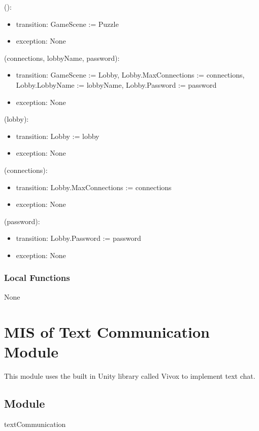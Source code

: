 \documentclass[12pt, titlepage]{article}
\begin{document}
():
\begin{itemize}
\item transition: GameScene := Puzzle
\item exception: None
\end{itemize}

(connections, lobbyName, password):
\begin{itemize}
\item transition: GameScene := Lobby, Lobby.MaxConnections := connections, Lobby.LobbyName := lobbyName, Lobby.Password := password
\item exception: None
\end{itemize}

(lobby):
\begin{itemize}
\item transition: Lobby := lobby
\item exception: None
\end{itemize}

(connections):
\begin{itemize}
\item transition: Lobby.MaxConnections := connections
\item exception: None
\end{itemize}

(password):
\begin{itemize}
\item transition: Lobby.Password := password
\item exception: None 
\end{itemize}

\subsubsection{Local Functions}

None

\newpage

\section{MIS of Text Communication Module} \label{sec:text} 

  This module uses the built in Unity library called Vivox to implement text chat.


\subsection{Module}
textCommunication
\end{document}
